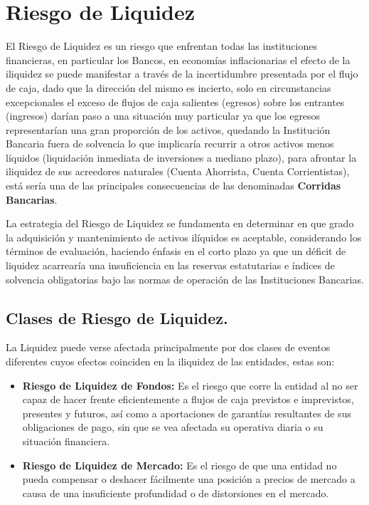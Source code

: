 \documentclass[]{article}
\begin{document}
\hypertarget{riesgo-de-liquidez}{%
\section{Riesgo de Liquidez}\label{riesgo-de-liquidez}}

El Riesgo de Liquidez es un riesgo que enfrentan todas las instituciones
financieras, en particular los Bancos, en economías inflacionarias el
efecto de la iliquidez se puede manifestar a través de la incertidumbre
presentada por el flujo de caja, dado que la dirección del mismo es
incierto, solo en circunstancias excepcionales el exceso de flujos de
caja salientes (egresos) sobre los entrantes (ingresos) darían paso a
una situación muy particular ya que los egresos representarían una gran
proporción de los activos, quedando la Institución Bancaria fuera de
solvencia lo que implicaría recurrir a otros activos menos líquidos
(liquidación inmediata de inversiones a mediano plazo), para afrontar la
iliquidez de sus acreedores naturales (Cuenta Ahorrista, Cuenta
Corrientistas), está sería una de las principales consecuencias de las
denominadas \textbf{Corridas Bancarias}.

La estrategia del Riesgo de Liquidez se fundamenta en determinar en que
grado la adquisición y mantenimiento de activos ilíquidos es aceptable,
considerando los términos de evaluación, haciendo énfasis en el corto
plazo ya que un déficit de liquidez acarrearía una insuficiencia en las
reservas estatutarias e índices de solvencia obligatorias bajo las
normas de operación de las Instituciones Bancarias.

\hypertarget{clases-de-riesgo-de-liquidez.}{%
\subsection{\texorpdfstring{\textbf{Clases de Riesgo de
Liquidez.}}{Clases de Riesgo de Liquidez.}}\label{clases-de-riesgo-de-liquidez.}}

La Liquidez puede verse afectada principalmente por dos clases de
eventos diferentes cuyos efectos coinciden en la iliquidez de las
entidades, estas son:

\begin{itemize}
\item
  \textbf{Riesgo de Liquidez de Fondos:} Es el riesgo que corre la
  entidad al no ser capaz de hacer frente eficientemente a flujos de
  caja previstos e imprevistos, presentes y futuros, así como a
  aportaciones de garantías resultantes de sus obligaciones de pago, sin
  que se vea afectada su operativa diaria o su situación financiera.
\item
  \textbf{Riesgo de Liquidez de Mercado:} Es el riesgo de que una
  entidad no pueda compensar o deshacer fácilmente una posición a
  precios de mercado a causa de una insuficiente profundidad o de
  distorsiones en el mercado.
\end{itemize}
\end{document}
